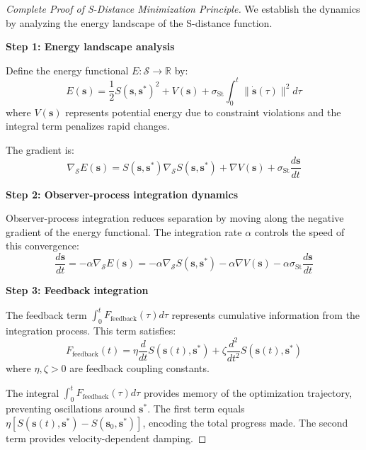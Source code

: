 \documentclass[11pt]{article}
\theoremstyle{definition}
\theoremstyle{remark}
\newcommand{\Real}{\mathbb{R}}
\newcommand{\SEntropy}{\mathcal{S}}
\newcommand{\StellasConstant}{\sigma_{\text{St}}}
\begin{document}
\begin{proof}[Complete Proof of S-Distance Minimization Principle]
We establish the dynamics by analyzing the energy landscape of the S-distance function.

\textbf{Step 1: Energy landscape analysis}

Define the energy functional $E: \SEntropy \to \Real$ by:
\begin{equation}
E(\mathbf{s}) = \frac{1}{2} S(\mathbf{s}, \mathbf{s}^*)^2 + V(\mathbf{s}) + \StellasConstant \int_0^t \|\dot{\mathbf{s}}(\tau)\|^2 d\tau
\end{equation}
where $V(\mathbf{s})$ represents potential energy due to constraint violations and the integral term penalizes rapid changes.

The gradient is:
\begin{equation}
\nabla_{\SEntropy} E(\mathbf{s}) = S(\mathbf{s}, \mathbf{s}^*) \nabla_{\SEntropy} S(\mathbf{s}, \mathbf{s}^*) + \nabla V(\mathbf{s}) + \StellasConstant \frac{d\mathbf{s}}{dt}
\end{equation}

\textbf{Step 2: Observer-process integration dynamics}

Observer-process integration reduces separation by moving along the negative gradient of the energy functional. The integration rate $\alpha$ controls the speed of this convergence:
\begin{equation}
\frac{d\mathbf{s}}{dt} = -\alpha \nabla_{\SEntropy} E(\mathbf{s}) = -\alpha \nabla_{\SEntropy} S(\mathbf{s}, \mathbf{s}^*) - \alpha \nabla V(\mathbf{s}) - \alpha \StellasConstant \frac{d\mathbf{s}}{dt}
\end{equation}

\textbf{Step 3: Feedback integration}

The feedback term $\int_0^t F_{\text{feedback}}(\tau) d\tau$ represents cumulative information from the integration process. This term satisfies:
\begin{equation}
F_{\text{feedback}}(t) = \eta \frac{d}{dt} S(\mathbf{s}(t), \mathbf{s}^*) + \zeta \frac{d^2}{dt^2} S(\mathbf{s}(t), \mathbf{s}^*)
\end{equation}
where $\eta, \zeta > 0$ are feedback coupling constants.

The integral $\int_0^t F_{\text{feedback}}(\tau) d\tau$ provides memory of the optimization trajectory, preventing oscillations around $\mathbf{s}^*$. The first term equals $\eta [S(\mathbf{s}(t), \mathbf{s}^*) - S(\mathbf{s}_0, \mathbf{s}^*)]$, encoding the total progress made. The second term provides velocity-dependent damping.


\end{proof}
\end{document}
